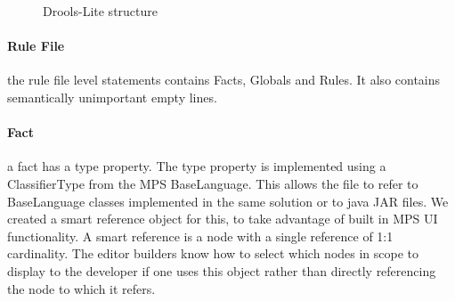 \begin{figure}[htbp]
    \centering
    \caption{Drools-Lite structure}
    \label{fig:DroolsLiteDiagram}
\end{figure}
 
\paragraph{Rule File} the rule file level statements contains Facts, Globals and Rules.
It also contains semantically unimportant empty lines.

\paragraph{Fact} a fact has a type property.
The type property is implemented using a ClassifierType from the MPS BaseLanguage.
This allows the file to refer to BaseLanguage classes implemented in the same solution or to java JAR files.
We created a smart reference object for this, to take advantage of built in MPS UI functionality.
A smart reference is a node with a single reference of 1:1 cardinality.
The editor builders know how to select which nodes in scope to display to the developer if one uses this object rather than directly referencing the node to which it refers.

